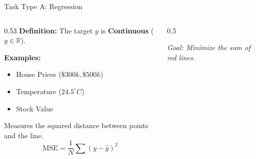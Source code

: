 \begin{frame}{Task Type A: Regression}
    \begin{columns}[c]
        \begin{column}{0.53\textwidth}
            \textbf{Definition:}
            The target $y$ is \textbf{Continuous} ($y \in \mathbb{R}$).
            
            \vspace{1em}
            \textbf{Examples:}
            \begin{itemize}
                \item House Prices ($\$300k, \$500k$)
                \item Temperature ($24.5^\circ C$)
                \item Stock Value
            \end{itemize}

            \vspace{1em}
            \begin{tcolorbox}[colback=blue!5, title=The Loss: Mean Squared Error]
                Measures the squared distance between points and the line.
                $$ \text{MSE} = \frac{1}{N} \sum (y - \hat{y})^2 $$
            \end{tcolorbox}
        \end{column}

        \begin{column}{0.5\textwidth}
            \centering
            \vspace{0.5em}
            \small \textit{Goal: Minimize the sum of red lines.}
        \end{column}
    \end{columns}
\end{frame}

